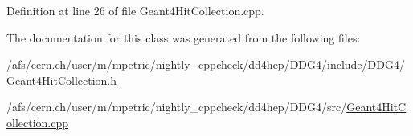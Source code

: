 Definition at line 26 of file Geant4HitCollection.cpp.

The documentation for this class was generated from the following files:\begin{DoxyCompactItemize}
\item 
/afs/cern.ch/user/m/mpetric/nightly\_\-cppcheck/dd4hep/DDG4/include/DDG4/\hyperlink{_geant4_hit_collection_8h}{Geant4HitCollection.h}\item 
/afs/cern.ch/user/m/mpetric/nightly\_\-cppcheck/dd4hep/DDG4/src/\hyperlink{_geant4_hit_collection_8cpp}{Geant4HitCollection.cpp}\end{DoxyCompactItemize}
